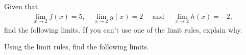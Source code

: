 \documentclass[addpoints, 12pt]{exam}%
\newcommand{\ra}{\rightarrow}
\theoremstyle{definition}
\begin{document}
\begin{questions}

\question
Given that
	\begin{align*}
	\lim_{x \ra 2} f(x) = 5 , \quad \lim_{x \ra 2} g(x) = 2 \quad \text{ and } \quad \lim_{x \ra 2} h(x) = -2 ,
	\end{align*}
find the following limits. If you can't use one of the limit rules, explain why.
\begin{multicols}{2}
\end{multicols}
	
\newpage

\phantom{2}

\newpage

\question
Using the limit rules, find the following limits.

\begin{multicols}{2}
\end{multicols}

\newpage

\phantom{2}

\end{questions}
\end{document}
